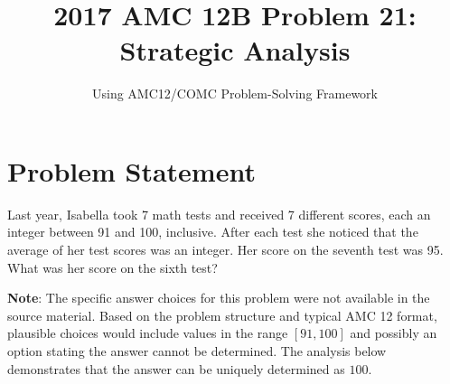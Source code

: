 \documentclass[11pt]{article}
\title{\textbf{2017 AMC 12B Problem 21: Strategic Analysis}}
\author{Using AMC12/COMC Problem-Solving Framework}
\date{}
\begin{document}
\maketitle

\section*{Problem Statement}
Last year, Isabella took 7 math tests and received 7 different scores, each an integer between 91 and 100, inclusive. After each test she noticed that the average of her test scores was an integer. Her score on the seventh test was 95. What was her score on the sixth test?

\textbf{Note}: The specific answer choices for this problem were not available in the source material. Based on the problem structure and typical AMC 12 format, plausible choices would include values in the range $[91, 100]$ and possibly an option stating the answer cannot be determined. The analysis below demonstrates that the answer can be uniquely determined as $\boxed{100}$.
\end{document}
